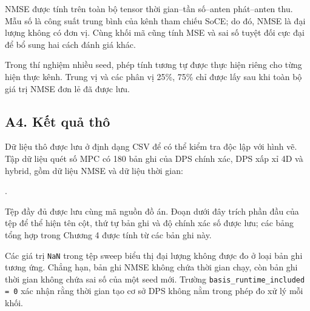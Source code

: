 NMSE được tính trên toàn bộ tensor thời gian--tần số--anten phát--anten thu. Mẫu số là công suất trung bình của kênh tham chiếu SoCE; do đó, NMSE là đại lượng không có đơn vị. Cùng khối mã cũng tính MSE và sai số tuyệt đối cực đại để bổ sung hai cách đánh giá khác.



Trong thí nghiệm nhiều seed, phép tính tương tự được thực hiện riêng cho từng hiện thực kênh. Trung vị và các phân vị 25\%, 75\% chỉ được lấy sau khi toàn bộ giá trị NMSE đơn lẻ đã được lưu.

\subsection*{A4. Kết quả thô}
{}
\label{app:raw_results}

Dữ liệu thô được lưu ở định dạng CSV để có thể kiểm tra độc lập với hình vẽ. Tập dữ liệu quét số MPC có 180 bản ghi của DPS chính xác, DPS xấp xỉ 4D và hybrid, gồm dữ liệu NMSE và dữ liệu thời gian:

{\scriptsize{}}.

Tệp đầy đủ được lưu cùng mã nguồn đồ án. Đoạn dưới đây trích phần đầu của tệp để thể hiện tên cột, thứ tự bản ghi và độ chính xác số được lưu; các bảng tổng hợp trong Chương 4 được tính từ các bản ghi này.



Các giá trị \texttt{NaN} trong tệp sweep biểu thị đại lượng không được đo ở loại bản ghi tương ứng. Chẳng hạn, bản ghi NMSE không chứa thời gian chạy, còn bản ghi thời gian không chứa sai số của một seed mới. Trường \texttt{basis\_runtime\_included = 0} xác nhận rằng thời gian tạo cơ sở DPS không nằm trong phép đo xử lý mỗi khối.

\cleardoublepage

